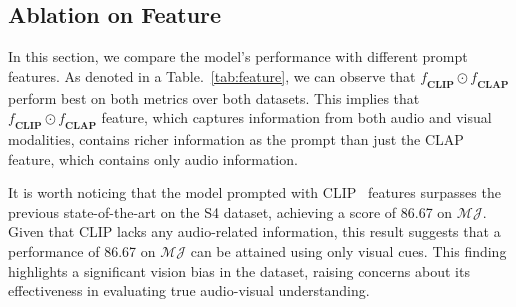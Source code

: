 
\subsection{Ablation on Feature}
In this section, we compare the model's performance with different prompt features. As denoted in a Table.~\ref{tab:feature}, we can observe that $\mathbf{\textit{f}_{CLIP} \odot \textit{f}_{CLAP}}$ perform best on both metrics over both datasets. This implies that $\mathbf{\textit{f}_{CLIP} \odot \textit{f}_{CLAP}}$ feature, which captures information from both audio and visual modalities, contains richer information as the prompt than just the CLAP feature, which contains only audio information.

It is worth noticing that the model prompted with CLIP~\cite{radford2021clip} features surpasses the previous state-of-the-art on the S4 dataset, achieving a score of 86.67 on $\mathcal{M}{\mathcal{J}}$. Given that CLIP lacks any audio-related information, this result suggests that a performance of 86.67 on $\mathcal{M}{\mathcal{J}}$ can be attained using only visual cues. This finding highlights a significant vision bias in the dataset, raising concerns about its effectiveness in evaluating true audio-visual understanding.




% 
